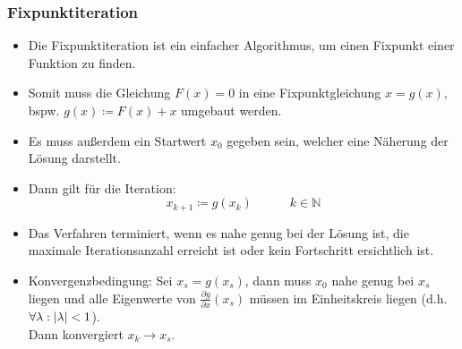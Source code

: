             \subsubsection{Fixpunktiteration} %
                \begin{itemize}
                	\item Die Fixpunktiteration ist ein einfacher Algorithmus, um einen Fixpunkt einer Funktion zu finden.
                	\item Somit muss die Gleichung \( F(x) = 0 \) in eine Fixpunktgleichung \( x = g(x) \), bspw. \( g(x) \coloneqq F(x) + x \) umgebaut werden.
                	\item Es muss außerdem ein Startwert \( x _ 0 \) gegeben sein, welcher eine Näherung der Lösung darstellt.
                	\item Dann gilt für die Iteration:
	                	\begin{equation*}
		                	 x_ { k + 1 } \coloneqq g(x _ k) \quad\quad\quad k \in \mathbb{N}
	                	\end{equation*}
                	\item Das Verfahren terminiert, wenn es nahe genug bei der Lösung ist, die maximale Iterationsanzahl erreicht ist oder kein Fortschritt ersichtlich ist.
                	\item Konvergenzbedingung: Sei \( x _ s = g(x _ s) \), dann muss \( x _ 0 \) nahe genug bei \( x _ s \) liegen und alle Eigenwerte von \( \frac{\partial g}{\partial x} (x _ s) \) müssen im Einheitskreis liegen (d.h. \( \forall \lambda : \abs{\lambda} < 1 \)). \\ Dann konvergiert \( x _ k \rightarrow x _ s \).
                \end{itemize}

